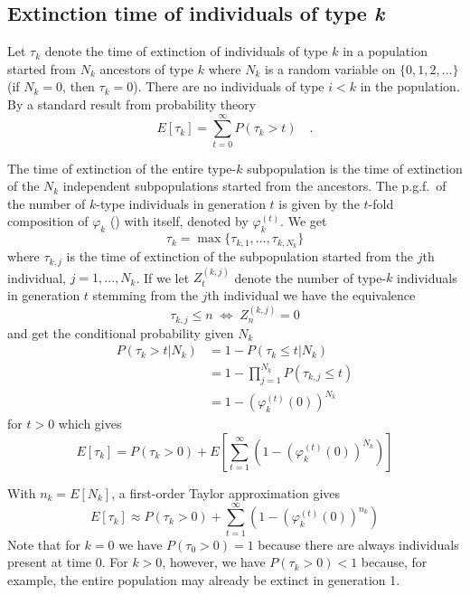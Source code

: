 \documentclass[9pt,lineno]{elife}
\begin{document}
\subsection{Extinction time of individuals of type \emph{k}}


Let $\tau_k$ denote the time of extinction of individuals of type $k$ in a population started from $N_{k}$ ancestors of type $k$ where $N_k$ is a random variable on $\{0,1,2,...\}$ (if $N_k=0$, then $\tau_k=0$).  
There are no individuals of type $i < k$ in the population.
By a standard result from probability theory
%
\begin{equation*}
E[\tau_k]=\sum_{t=0}^{\infty}P(\tau_k>t) \quad .
\end{equation*}

The time of extinction of the entire type-$k$ subpopulation is the time of extinction of the $N_{k}$ independent subpopulations started from the ancestors. The p.g.f.\ of the number of $k$-type individuals in generation $t$ is given by the $t$-fold composition of $\varphi_k$ () with itself, denoted by $\varphi^{(t)}_k$. We get
%
$$\tau_{k}=\max\{\tau_{k,1},...,\tau_{k,N_{k}}\}$$
%
where $\tau_{k,j}$ is the time of extinction of the subpopulation started from the $j$th individual, $j=1,...,N_k$. If we let $Z_{t}^{(k,j)}$ denote the number of type-$k$ individuals in generation $t$ stemming from the $j$th individual we have the equivalence 
%
\begin{equation*}
\tau_{k,j}\leq n \; \Leftrightarrow \; Z_{n}^{(k,j)}=0
\end{equation*}
%
and get the conditional probability given $N_k$
%
\begin{align*}
%
P(\tau_{k}>t|N_k) & =  1-P(\tau_{k}\leq t|N_k)\\[3pt]
           & =  1-\prod_{j=1}^{N_{k}}P(\tau_{k,j}\leq t)\\[3pt]
           & =  1-\left(\varphi_{k}^{(t)}(0)\right)^{N_{k}}
\end{align*}
%
for $t>0$ which gives 
%
\begin{equation*}
%
E[\tau_{k}] = P(\tau_{k}>0) + E\left[\sum_{t=1}^{\infty}\left(1-\left(\varphi_{k}^{(t)}(0)\right)^{N_{k}}\right)\right]
%
\end{equation*}

With $n_k=E[N_k]$, a first-order Taylor approximation gives 
%
\begin{equation}
%
E[\tau_{k}] \approx P(\tau_{k}>0) + \sum_{t=1}^{\infty}\left(1-\left(\varphi_{k}^{(t)}(0)\right)^{n_{k}}\right)
%
\label{eq:tauk}
\end{equation}
%
Note that for $k=0$ we have $P(\tau_{0}>0)=1$ because there are always individuals present at time $0$. For $k>0$, however, we have $P(\tau_{k}>0)<1$ because, for example, 
the entire population may already be extinct
in generation 1. 
\end{document}

